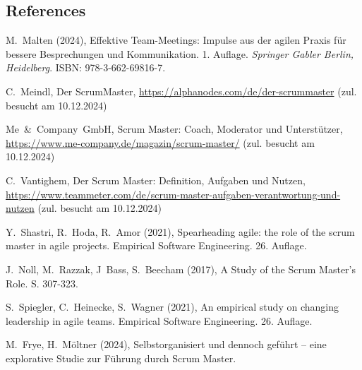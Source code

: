 \documentclass[5pt, final]{beamer}
\begin{document}
\begin{frame}[t]
\begin{multicols}{3}
			
			
			\subsection{References}
						
			\begin{thebibliography}{99}
				
%				
%				
				
				 M.~Malten (2024), Effektive Team-Meetings: Impulse aus der agilen Praxis für bessere Besprechungen und Kommunikation. 1. Auflage. \textit{Springer Gabler Berlin, Heidelberg}. ISBN: 978-3-662-69816-7.
				
				 C.~Meindl, Der ScrumMaster, \url{https://alphanodes.com/de/der-scrummaster} (zul. besucht am 10.12.2024)
				
				 Me~\&~Company~GmbH, Scrum Master: Coach, Moderator und Unterstützer, \url{https://www.me-company.de/magazin/scrum-master/} (zul. besucht am 10.12.2024)
				
				 C.~Vantighem, Der Scrum Master: Definition, Aufgaben und Nutzen, \url{https://www.teammeter.com/de/scrum-master-aufgaben-verantwortung-und-nutzen} (zul. besucht am 10.12.2024)
				
				 Y.~Shastri, R.~Hoda, R.~Amor (2021), Spearheading agile: the role of the scrum master in agile projects. Empirical Software Engineering. 26. Auflage.
				
				 J.~Noll, M.~Razzak, J~Bass, S.~Beecham (2017), A Study of the Scrum Master's Role. S. 307-323.
				
				 S.~Spiegler, C.~Heinecke, S.~Wagner (2021), An empirical study on changing leadership in agile teams. Empirical Software Engineering. 26. Auflage.
				
				 M.~Frye, H.~Möltner (2024), Selbstorganisiert und dennoch geführt – eine explorative Studie zur Führung durch Scrum Master.
                

\end{thebibliography}
\end{multicols}
\end{frame}
\end{document}
